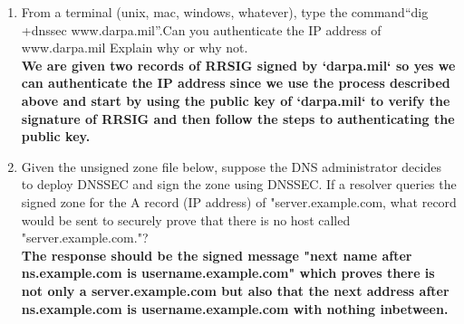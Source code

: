 \documentclass[12pt]{article}
\begin{document}
\begin{enumerate}
  \item From a terminal (unix, mac, windows, whatever), type the command“dig +dnssec www.darpa.mil”.Can you authenticate the IP address of www.darpa.mil Explain why or why not.\\

  \textbf{We are given two records of RRSIG signed by `darpa.mil` so yes we can authenticate the IP address since we use the process described above and start by using the public key of `darpa.mil` to verify the signature of RRSIG and then follow the steps to authenticating the public key.} \\

  \item Given the unsigned zone file below, suppose the DNS administrator decides to deploy DNSSEC and sign the zone using  DNSSEC.  If a resolver queries the signed zone for the A record (IP address) of "server.example.com, what record would be sent to securely prove that there is no host called "server.example.com."? \\

  \textbf{The response should be the signed message "next name after ns.example.com is username.example.com" which proves there is not only a server.example.com but also that the next address after ns.example.com is username.example.com with nothing inbetween.} \\

\end{enumerate}
\end{document}
